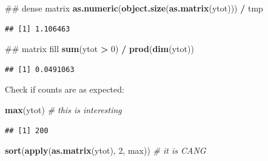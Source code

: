 \documentclass[12pt,]{book}
\newenvironment{Shaded}{\begin{snugshade}}{\end{snugshade}}
\newcommand{\CommentTok}[1]{\textcolor[rgb]{0.56,0.35,0.01}{\textit{#1}}}
\newcommand{\DecValTok}[1]{\textcolor[rgb]{0.00,0.00,0.81}{#1}}
\newcommand{\KeywordTok}[1]{\textcolor[rgb]{0.13,0.29,0.53}{\textbf{#1}}}
\newcommand{\NormalTok}[1]{#1}
\newcommand{\OperatorTok}[1]{\textcolor[rgb]{0.81,0.36,0.00}{\textbf{#1}}}
\newcommand{\StringTok}[1]{\textcolor[rgb]{0.31,0.60,0.02}{#1}}
\begin{document}
\begin{Shaded}
\begin{Highlighting}[]
\NormalTok{## dense matrix}
\KeywordTok{as.numeric}\NormalTok{(}\KeywordTok{object.size}\NormalTok{(}\KeywordTok{as.matrix}\NormalTok{(ytot))) }\OperatorTok{/}\StringTok{ }\NormalTok{tmp}
\end{Highlighting}
\end{Shaded}

\begin{verbatim}
## [1] 1.106463
\end{verbatim}

\begin{Shaded}
\begin{Highlighting}[]
\NormalTok{## matrix fill}
\KeywordTok{sum}\NormalTok{(ytot }\OperatorTok{>}\StringTok{ }\DecValTok{0}\NormalTok{) }\OperatorTok{/}\StringTok{ }\KeywordTok{prod}\NormalTok{(}\KeywordTok{dim}\NormalTok{(ytot))}
\end{Highlighting}
\end{Shaded}

\begin{verbatim}
## [1] 0.0491063
\end{verbatim}

Check if counts are as expected:

\begin{Shaded}
\begin{Highlighting}[]
\KeywordTok{max}\NormalTok{(ytot) }\CommentTok{# this is interesting}
\end{Highlighting}
\end{Shaded}

\begin{verbatim}
## [1] 200
\end{verbatim}

\begin{Shaded}
\begin{Highlighting}[]
\KeywordTok{sort}\NormalTok{(}\KeywordTok{apply}\NormalTok{(}\KeywordTok{as.matrix}\NormalTok{(ytot), }\DecValTok{2}\NormalTok{, max)) }\CommentTok{# it is CANG}
\end{Highlighting}
\end{Shaded}
\end{document}
